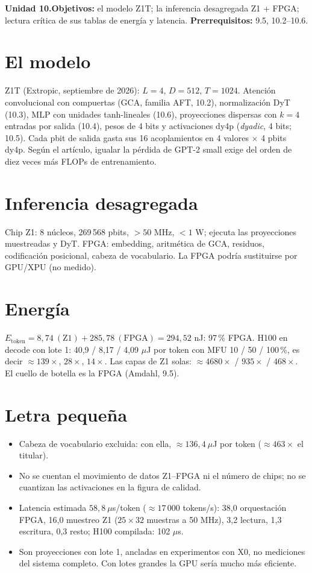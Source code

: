 \documentclass[11pt,a4paper]{article}
\begin{document}

\noindent\textbf{Unidad 10.}\quad\textbf{Objetivos:} el modelo Z1T; la inferencia desagregada Z1 + FPGA; lectura crítica de sus tablas de energía y latencia.
\textbf{Prerrequisitos:} 9.5, 10.2--10.6.

\section{El modelo}
Z1T (Extropic, septiembre de 2026): $L=4$, $D=512$, $T=1024$. Atención convolucional con compuertas (GCA, familia AFT, 10.2), normalización DyT (10.3), MLP con unidades
tanh-lineales (10.6), proyecciones dispersas con $k=4$ entradas por salida (10.4), pesos de 4 bits y activaciones dy4p (\emph{dyadic}, 4 bits; 10.5). Cada pbit de salida
gasta sus 16 acoplamientos en 4 valores $\times$ 4 pbits dy4p. Según el artículo, igualar la pérdida de GPT-2 small exige del orden de diez veces más FLOPs de
entrenamiento.

\section{Inferencia desagregada}
Chip Z1: 8 núcleos, 269\,568 pbits, $>50$ MHz, $<1$ W; ejecuta las proyecciones muestreadas y DyT. FPGA: embedding, aritmética de GCA, residuos, codificación posicional,
cabeza de vocabulario. La FPGA podría sustituirse por GPU/XPU (no medido).

\section{Energía \evP}
$E_{\text{token}}=8{,}74\ (\text{Z1})+285{,}78\ (\text{FPGA})=294{,}52$ nJ: 97\,\% FPGA. H100 en decode con lote 1: 40{,}9 / 8{,}17 / 4{,}09 $\mu$J por token con MFU
10 / 50 / 100\,\%, es decir $\approx139\times$, $28\times$, $14\times$. Las capas de Z1 solas: $\approx4680\times$ / $935\times$ / $468\times$. El cuello de botella es la FPGA
(Amdahl, 9.5).

\section{Letra pequeña}
\begin{itemize}[nosep]
\item Cabeza de vocabulario excluida: con ella, $\approx136{,}4\ \mu$J por token ($\approx463\times$ el titular).
\item No se cuentan el movimiento de datos Z1--FPGA ni el número de chips; no se cuantizan las activaciones en la figura de calidad.
\item Latencia estimada $58{,}8\ \mu$s/token ($\approx17\,000$ tokens/s): 38{,}0 orquestación FPGA, 16{,}0 muestreo Z1 ($25\times32$ muestras a 50 MHz), 3{,}2 lectura,
1{,}3 escritura, 0{,}3 resto; H100 compilada: 102 $\mu$s.
\item Son proyecciones con lote 1, ancladas en experimentos con X0, no mediciones del sistema completo. Con lotes grandes la GPU sería mucho más eficiente.
\end{itemize}
\end{document}
